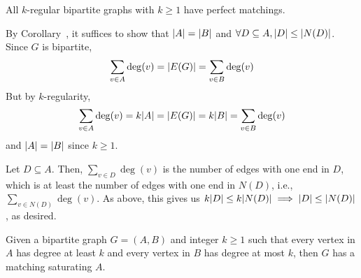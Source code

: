 \documentclass[class=math239,notes,tikz]{agony}
\begin{document}
\begin{theorem}[8.6.2]
  All $k$-regular bipartite graphs with $k \geq 1$ have perfect matchings.
\end{theorem}
\begin{prf}
  By Corollary~, it suffices to show that $\abs{A}=\abs{B}$
  and $\forall D \subseteq A, \abs{D} \leq \abs{N(D)}$.
  Since $G$ is bipartite,
  \[ \sum_{v \in A}\deg(v) = \abs{E(G)} = \sum_{v \in B}\deg(v) \]
  But by $k$-regularity,
  \[ \sum_{v \in A}\deg(v) = k\abs{A} = \abs{E(G)} = k\abs{B} = \sum_{v \in B}\deg(v) \]
  and $\abs{A} = \abs{B}$ since $k \geq 1$.

  Let $D \subseteq A$.
  Then, $\sum_{v \in D} \deg(v)$ is the number of edges with one end in $D$,
  which is at least the number of edges with one end in $N(D)$, i.e.,
  $\sum_{v \in N(D)} \deg(v)$.
  As above, this gives us $k\abs{D} \leq k\abs{N(D)} \implies \abs{D} \leq \abs{N(D)}$, as desired.
\end{prf}

\begin{theorem}
  Given a bipartite graph $G = (A,B)$
  and integer $k \geq 1$ such that every vertex in $A$ has degree at least $k$
  and every vertex in $B$ has degree at most $k$,
  then $G$ has a matching saturating $A$.
\end{theorem}
\end{document}
